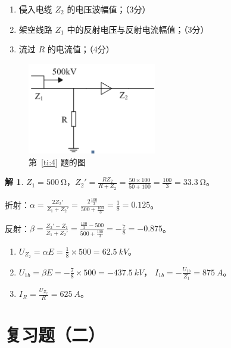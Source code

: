 \documentclass[zihao=-4,fontset = none]{ctexart}
\theoremstyle{definition}
\newtheorem*{solution}{解}
\begin{document}
\begin{enumerate}
\begin{enumerate}
    \item 侵入电缆 $Z_2$ 的电压波幅值；（3分）
    \item 架空线路 $Z_1$ 中的反射电压与反射电流幅值；（3分）
    \item 流过 $R$ 的电流值；（4分）
  \end{enumerate}
  \begin{figure}[htbp]
    \centering
    \includegraphics[width=0.5\textwidth]{1.png}
    \caption{第~\ref{ti:4} 题的图}\label{fig:1-4}
  \end{figure}
  \begin{solution}
    $Z_1 = \SI{500}{\ohm}$，$Z_2' = \frac{RZ_2}{R+Z_2} = \frac{50\times100}{50+100} = \frac{100}{3} = \SI{33.3}{\ohm}$。

    折射：$\alpha = \frac{2Z_2'}{Z_1 + Z_2'} = \frac{2 \frac{100}{3}}{500 + \frac{100}{3}} = \frac{1}{8} = 0.125$。

    反射：$\beta = \frac{Z_2' - Z_1}{Z_1 + Z_2'} = \frac{\frac{100}{3} - 500}{500 + \frac{100}{3}} = -\frac{7}{8} = -0.875$。
    \begin{enumerate}
      \item $U_{Z_2} = \alpha E = \frac{1}{8} \times 500 = \SI{62.5}{kV}$。
      \item $U_{1b} = \beta E = -\frac{7}{8} \times 500 = -\SI{437.5}{kV}$，
      $I_{1b} = -\frac{U_{1b}}{Z_1} = \SI{875}{A}$。
      \item $I_R = \frac{U_{Z_2}}{R} = \SI{625}{A}$。
    \end{enumerate}
  \end{solution}
\end{enumerate}

\section{复习题（二）}
\end{document}
